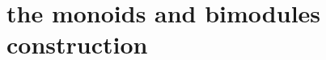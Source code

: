 \documentclass[11pt,oneside,article]{memoir}
\begin{document}



\section{the monoids and bimodules construction}\label{sec:monoids_bimods}
\end{document}
